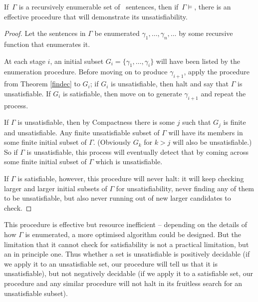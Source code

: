 \begin{theorem}\label{posdecinc}
If\, $\Gamma$ is a recursively enumerable set of \lone\ sentences, then if\, $\Gamma\vDash$, there is an effective procedure that will demonstrate its unsatisfiability.
\begin{proof}
	Let the sentences in $\Gamma$ be enumerated $\gamma_{1},…,\gamma_{n},…$ by some recursive function that enumerates it.

	At each stage $i$, an initial subset $G_{i} = \{\gamma_{1},…,\gamma_{i}\}$ will have been listed by the enumeration procedure. Before moving on to produce $\gamma_{i+1}$, apply the procedure from Theorem \ref{findec} to $G_{i}$; if $G_{i}$ is unsatisfiable, then halt and say that $\Gamma$ is unsatisfiable. If $G_{i}$ is satisfiable, then move on to generate $\gamma_{i+1}$ and repeat the process.

If $\Gamma$ is unsatisfiable, then by Compactness there is some $j$ such that $G_{j}$ is finite and unsatisfiable.  Any finite unsatisfiable subset of $\Gamma$ will have its members in some finite initial subset of $\Gamma$. (Obviously $G_{k}$ for $k>j$ will also be unsatisfiable.) So if $\Gamma$ is unsatisfiable, this process will eventually detect that by coming across some finite initial subset of $\Gamma$ which is unsatisfiable. 

If $\Gamma$ is satisfiable, however, this procedure will never halt: it will keep checking larger and larger initial subsets of $\Gamma$ for unsatisfiability, never finding any of them to be unsatisfiable, but also never running out of new larger candidates to check.
\end{proof}
\end{theorem}

This procedure is effective but resource inefficient – depending on the details of how $\Gamma$ is enumerated, a more optimised algorithm could be designed. But the limitation that it cannot check for satisfiability is not a practical limitation, but an in principle one. Thus whether a set is unsatisfiable is positively decidable (if we apply it to an unsatisfiable set, our procedure will tell us that it is unsatisfiable), but not negatively decidable (if we apply it to a satisfiable set, our procedure and any similar procedure will not halt in its fruitless search for an unsatisfiable subset).






